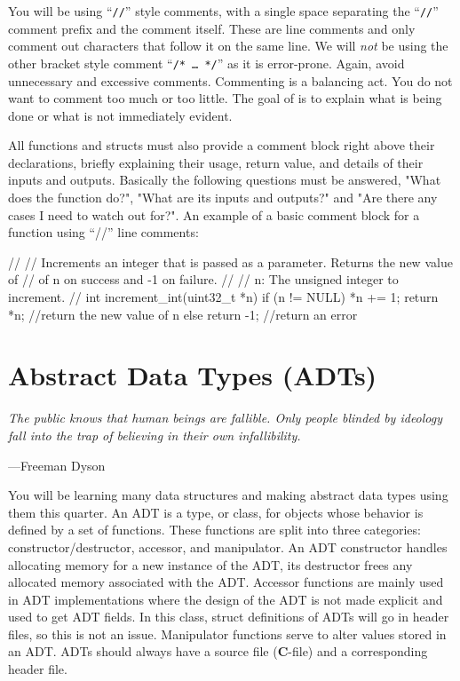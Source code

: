 \documentclass[11pt]{article}
\begin{document}
\noindent You will be using ``\texttt{//}'' style comments, with a single space
separating the ``\texttt{//}'' comment prefix and the comment itself. These are
line comments and only comment out characters that follow it on the same line.
We will \emph{not} be using the other bracket style comment ``\texttt{/* \ldots
*/}'' as it is error-prone.  Again, avoid unnecessary and excessive comments.
Commenting is a balancing act.  You do not want to comment too much or too
little. The goal of is to explain what is being done or what is not immediately
evident.

All functions and structs must also provide a comment block right above their
declarations, briefly explaining their usage, return value, and details of their
inputs and outputs. Basically the following questions must be answered, 
"What does the function do?", 
"What are its inputs and outputs?" and "Are there any cases I need to watch out for?".
An example of a basic comment block for a function using
``//'' line comments:

\begin{codelisting}{}
//
// Increments an integer that is passed as a parameter. Returns the new value of
// of n on success and -1 on failure.
//
// n:  The unsigned integer to increment.
//
int increment_int(uint32_t *n) {
    if (n != NULL) {
        *n += 1;
        return *n; //return the new value of n
    } else {
        return -1; //return an error
  }
}
\end{codelisting}


\section{Abstract Data Types (ADTs)}

\epigraph{\emph{The public knows that human beings are fallible. Only
people blinded by ideology fall into the trap of believing in their
own infallibility.}}{---Freeman Dyson}

\noindent You will be learning many data structures and making abstract data
types using them this quarter. An ADT is a type, or class, for objects whose
behavior is defined by a set of functions. These functions are split into three
categories: constructor/destructor, accessor, and manipulator. An ADT
constructor handles allocating memory for a new instance of the ADT, its
destructor frees any allocated memory associated with the ADT. Accessor
functions are mainly used in ADT implementations where the design of the ADT is
not made explicit and used to get ADT fields. In this class, struct definitions
of ADTs will go in header files, so this is not an issue. Manipulator functions
serve to alter values stored in an ADT. ADTs should always have a source file
(\textbf{C}-file) and a corresponding header file.
\end{document}
